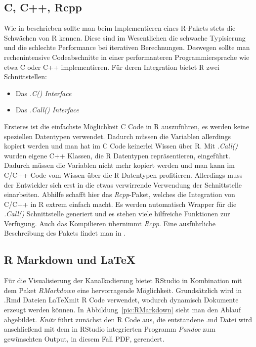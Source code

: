 \subsection{C, C++, Rcpp}

Wie in \cite{Rextension} beschrieben sollte man beim Implementieren eines R-Pakets stets die Schwächen von R kennen. Diese sind im Wesentlichen die schwache Typisierung und die schlechte Performance bei iterativen Berechnungen. Deswegen sollte man rechenintensive Codeabschnitte in einer performanteren Programmiersprache wie etwa C oder C++ implementieren. Für deren Integration bietet R zwei Schnittstellen:

\begin{itemize}
\item Das \emph{.C() Interface}
\item Das \emph{.Call() Interface}
\end{itemize}

Ersteres ist die einfachste Möglichkeit C Code in R auszuführen, es werden keine speziellen Datentypen verwendet. Dadurch müssen die Variablen allerdings kopiert werden und man hat im C Code keinerlei Wissen über R.
Mit \emph{.Call()} wurden eigene C++ Klassen, die R Datentypen repräsentieren, eingeführt. Dadurch müssen die Variablen nicht mehr kopiert werden und man kann im C/C++ Code vom Wissen über die R Datentypen profitieren.\cite{wickham2015r} Allerdings muss der Entwickler sich erst in die etwas verwirrende Verwendung der Schnittstelle einarbeiten. Abhilfe schafft hier das \emph{Rcpp}-Paket, welches die Integration von C/C++ in R extrem einfach macht. Es werden automatisch Wrapper für die \emph{.Call()} Schnittstelle generiert und es stehen viele hilfreiche Funktionen zur Verfügung. Auch das Kompilieren übernimmt \emph{Rcpp}. Eine ausführliche Beschreibung des Pakets findet man in \cite{wickham2015advanced}.

\subsection{R Markdown und \LaTeX}

Für die Visualisierung der Kanalkodierung bietet RStudio in Kombination mit dem Paket \emph{RMarkdown} eine hervorragende Möglichkeit. Grundsätzlich wird in .Rmd Dateien \LaTeX mit R Code verwendet, wodurch dynamisch Dokumente erzeugt werden können. In Abbildung~\ref{pic:RMarkdown} sieht man den Ablauf abgebildet. \emph{Knitr} führt zunächst den R Code aus, die entstandene .md Datei wird anschließend mit dem in RStudio integrierten Programm \emph{Pandoc} zum gewünschten Output, in diesem Fall PDF, gerendert.\cite{rmarkdown}

